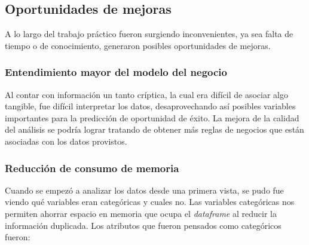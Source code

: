 \documentclass[titlepage,a4paper]{article}
\begin{document}
\subsection{Oportunidades de mejoras}
A lo largo del trabajo práctico fueron surgiendo inconvenientes, ya sea falta de tiempo o de conocimiento, generaron posibles oportunidades de mejoras.
\subsubsection{Entendimiento mayor del modelo del negocio}
Al contar con información un tanto críptica, la cual era difícil de asociar algo tangible, fue difícil interpretar los datos, desaprovechando así posibles variables importantes para la predicción de oportunidad de éxito. La mejora de la calidad del análisis se podría lograr tratando de obtener más reglas de negocios que están asociadas con los datos provistos.

\subsubsection{Reducción de consumo de memoria}
Cuando se empezó a analizar los datos desde una primera vista, se pudo fue viendo qué variables eran categóricas y cuales no. Las variables categóricas nos permiten ahorrar espacio en memoria que ocupa el \textit{dataframe} al reducir la información duplicada. Los atributos que fueron pensados como categóricos fueron:
\end{document}
